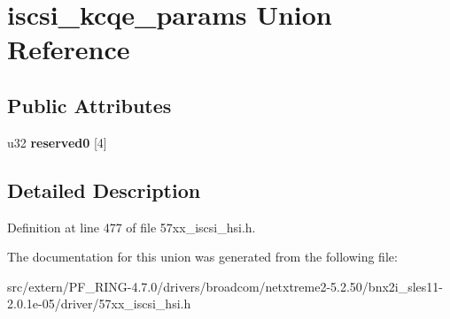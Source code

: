 \hypertarget{unioniscsi__kcqe__params}{
\section{iscsi\_\-kcqe\_\-params Union Reference}
\label{unioniscsi__kcqe__params}
}
\subsection*{Public Attributes}
\begin{DoxyCompactItemize}
\item 
\hypertarget{unioniscsi__kcqe__params_a6ffca5cb2dd9dc142c0fc2d4c8da3402}{
u32 {\bfseries reserved0} \mbox{[}4\mbox{]}}
\label{unioniscsi__kcqe__params_a6ffca5cb2dd9dc142c0fc2d4c8da3402}

\end{DoxyCompactItemize}


\subsection{Detailed Description}


Definition at line 477 of file 57xx\_\-iscsi\_\-hsi.h.



The documentation for this union was generated from the following file:\begin{DoxyCompactItemize}
\item 
src/extern/PF\_\-RING-\/4.7.0/drivers/broadcom/netxtreme2-\/5.2.50/bnx2i\_\-sles11-\/2.0.1e-\/05/driver/57xx\_\-iscsi\_\-hsi.h\end{DoxyCompactItemize}
